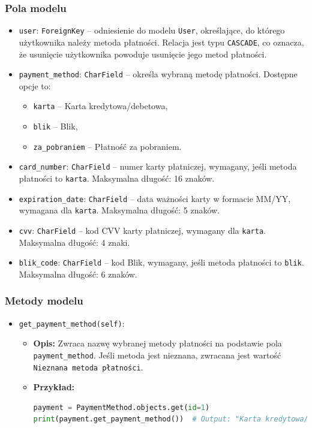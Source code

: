 \documentclass[12pt,a4paper,oneside]{article}
\theoremstyle{definition}
\numberwithin{equation}{section}
\begin{document}
\subsubsection{Pola modelu}
\begin{itemize}
    \item \texttt{user}: \texttt{ForeignKey} – odniesienie do modelu \texttt{User}, określające, do którego użytkownika należy metoda płatności. Relacja jest typu \texttt{CASCADE}, co oznacza, że usunięcie użytkownika powoduje usunięcie jego metod płatności.
    \item \texttt{payment\_method}: \texttt{CharField} – określa wybraną metodę płatności. Dostępne opcje to:
    \begin{itemize}
        \item \texttt{karta} – Karta kredytowa/debetowa,
        \item \texttt{blik} – Blik,
        \item \texttt{za\_pobraniem} – Płatność za pobraniem.
    \end{itemize}
    \item \texttt{card\_number}: \texttt{CharField} – numer karty płatniczej, wymagany, jeśli metoda płatności to \texttt{karta}. Maksymalna długość: 16 znaków.
    \item \texttt{expiration\_date}: \texttt{CharField} – data ważności karty w formacie MM/YY, wymagana dla \texttt{karta}. Maksymalna długość: 5 znaków.
    \item \texttt{cvv}: \texttt{CharField} – kod CVV karty płatniczej, wymagany dla \texttt{karta}. Maksymalna długość: 4 znaki.
    \item \texttt{blik\_code}: \texttt{CharField} – kod Blik, wymagany, jeśli metoda płatności to \texttt{blik}. Maksymalna długość: 6 znaków.
\end{itemize}

\subsubsection{Metody modelu}
\begin{itemize}
    \item \texttt{get\_payment\_method(self)}:
    \begin{itemize}
        \item \textbf{Opis:} Zwraca nazwę wybranej metody płatności na podstawie pola \texttt{payment\_method}. Jeśli metoda jest nieznana, zwracana jest wartość \texttt{Nieznana metoda płatności}.
        \item \textbf{Przykład:}
        \begin{lstlisting}[language=Python]
payment = PaymentMethod.objects.get(id=1)
print(payment.get_payment_method())  # Output: "Karta kredytowa/debetowa"
        \end{lstlisting}
    \end{itemize}
\end{itemize}
\end{document}
